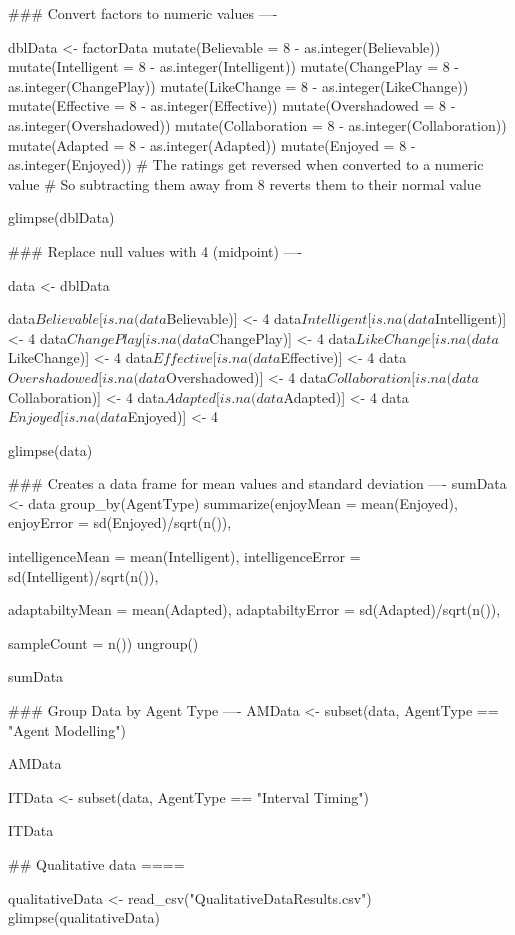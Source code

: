 \documentclass{IEEEtran}
\begin{document}
\begin{verbnobox}[\fontsize{10pt}{10pt}\selectfont]
### Convert factors to numeric values ----

dblData <- factorData %
  mutate(Believable = 8 - as.integer(Believable)) %
  mutate(Intelligent = 8 - as.integer(Intelligent)) %
  mutate(ChangePlay = 8 - as.integer(ChangePlay)) %
  mutate(LikeChange = 8 - as.integer(LikeChange)) %
  mutate(Effective = 8 - as.integer(Effective)) %
  mutate(Overshadowed = 8 - as.integer(Overshadowed)) %
  mutate(Collaboration = 8 - as.integer(Collaboration)) %
  mutate(Adapted = 8 - as.integer(Adapted)) %
  mutate(Enjoyed = 8 - as.integer(Enjoyed))
    # The ratings get reversed when converted to a numeric value
    # So subtracting them away from 8 reverts them to their normal value

glimpse(dblData)

### Replace null values with 4 (midpoint) ----

data <- dblData

  data$Believable[is.na(data$Believable)] <- 4
  data$Intelligent[is.na(data$Intelligent)] <- 4
  data$ChangePlay[is.na(data$ChangePlay)] <- 4
  data$LikeChange[is.na(data$LikeChange)] <- 4
  data$Effective[is.na(data$Effective)] <- 4
  data$Overshadowed[is.na(data$Overshadowed)] <- 4
  data$Collaboration[is.na(data$Collaboration)] <- 4
  data$Adapted[is.na(data$Adapted)] <- 4
  data$Enjoyed[is.na(data$Enjoyed)] <- 4

glimpse(data)

### Creates a data frame for mean values and standard deviation ----
sumData <- data %
  group_by(AgentType) %
  summarize(enjoyMean = mean(Enjoyed),
            enjoyError = sd(Enjoyed)/sqrt(n()),
            
            intelligenceMean = mean(Intelligent),
            intelligenceError = sd(Intelligent)/sqrt(n()),
            
            adaptabiltyMean = mean(Adapted),
            adaptabiltyError = sd(Adapted)/sqrt(n()),
            
            sampleCount = n())%
  ungroup()

sumData

### Group Data by Agent Type ----
AMData <- subset(data, AgentType == "Agent Modelling")

AMData

ITData <- subset(data, AgentType == "Interval Timing")

ITData


## Qualitative data ====

qualitativeData <- read_csv("QualitativeDataResults.csv")
glimpse(qualitativeData)


\end{verbnobox}
\end{document}
